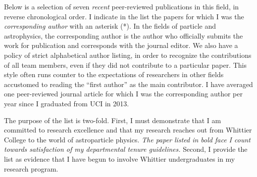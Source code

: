 \documentclass[../../main.tex]{subfiles}
\begin{document}
Below is a selection of seven \textit{recent} peer-reviewed publications in this field, in reverse chronological order.  I indicate in the list the papers for which I was the  \textit{corresponding author} with an asterisk (*).  In the fields of particle and astrophysics, the corresponding author is the author who officially submits the work for publication and corresponds with the journal editor.  We also have a policy of strict alphabetical author listing, in order to recognize the contributions of all team members, even if they did not contribute to a particular paper.  This style often runs counter to the expectations of researchers in other fields accustomed to reading the ``first author'' as the main contributor.  I have averaged one peer-reviewed journal article for which I was the corresponding author per year since I graduated from UCI in 2013. \\ \hspace{0.1cm}

The purpose of the list is two-fold.  First, I must demonstrate that I am committed to research excellence and that my research reaches out from Whittier College to the world of astroparticle physics.  \textit{The paper listed in bold face I count towards satisfaction of my departmental tenure guidelines.}  Second, I provide the list as evidence that I have begun to involve Whittier undergraduates in my research program. \\ \hspace{0.1cm}
\end{document}
